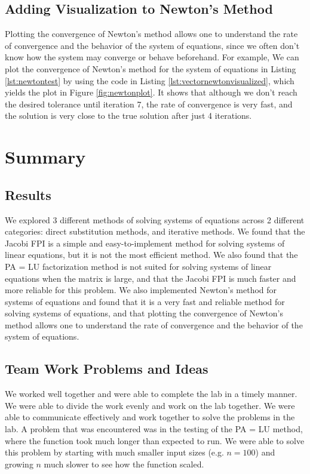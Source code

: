 \documentclass[11pt]{article}
\begin{document}
\subsection{Adding Visualization to Newton's Method}

Plotting the convergence of Newton's method allows one to understand the rate of convergence and the behavior of the system of equations, since we often don't know how the system may converge or behave beforehand. For example, We can plot the convergence of Newton's method for the system of equations in Listing \ref{lst:newtontest} by using the code in Listing \ref{lst:vectornewtonvisualized}, which yields the plot in Figure \ref{fig:newtonplot}. It shows that although we don't reach the desired tolerance until iteration 7, the rate of convergence is very fast, and the solution is very close to the true solution after just 4 iterations.

\section{Summary}

\subsection{Results}

We explored 3 different methods of solving systems of equations across 2 different categories: direct substitution methods, and iterative methods. We found that the Jacobi FPI is a simple and easy-to-implement method for solving systems of linear equations, but it is not the most efficient method. We also found that the PA = LU factorization method is not suited for solving systems of linear equations when the matrix is large, and that the Jacobi FPI is much faster and more reliable for this problem. We also implemented Newton's method for systems of equations and found that it is a very fast and reliable method for solving systems of equations, and that plotting the convergence of Newton's method allows one to understand the rate of convergence and the behavior of the system of equations.

\subsection{Team Work Problems and Ideas}

We worked well together and were able to complete the lab in a timely manner. We were able to divide the work evenly and work on the lab together. We were able to communicate effectively and work together to solve the problems in the lab. A problem that was encountered was in the testing of the PA = LU method, where the function took much longer than expected to run. We were able to solve this problem by starting with much smaller input sizes (e.g. $n = 100$) and growing $n$ much slower to see how the function scaled.
\end{document}
